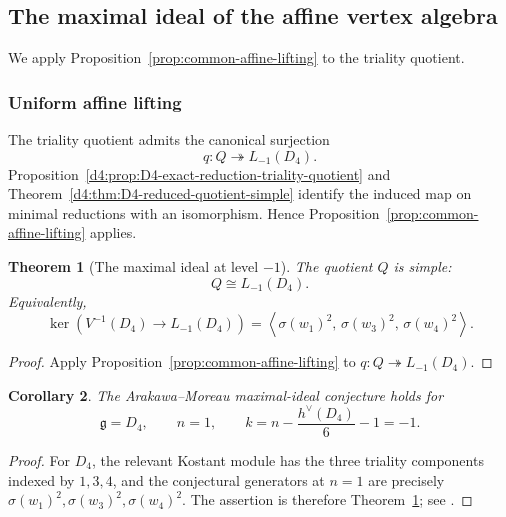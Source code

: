 \documentclass[11pt,reqno]{amsart}
\newtheorem{theorem}{Theorem}[section]
\newtheorem{corollary}[theorem]{Corollary}
\theoremstyle{definition}
\theoremstyle{remark}
\begin{document}
\subsection{The maximal ideal of the affine vertex algebra}


We apply Proposition~\ref{prop:common-affine-lifting} to the triality quotient.

\subsubsection{Uniform affine lifting}


The triality quotient admits the canonical surjection
\begin{equation*}
 q:Q\twoheadrightarrow L_{-1}(D_4).
\end{equation*}
Proposition~\ref{d4:prop:D4-exact-reduction-triality-quotient} and
Theorem~\ref{d4:thm:D4-reduced-quotient-simple} identify the induced map on
minimal reductions with an isomorphism.  Hence
Proposition~\ref{prop:common-affine-lifting} applies.

\begin{theorem}[The maximal ideal at level \(-1\)]
\label{d4:thm:D4-main-maximal-ideal}
The quotient \(Q\) is simple:
\begin{equation*}
  Q\cong L_{-1}(D_4).
\end{equation*}
Equivalently,
\begin{equation*}
  \ker\!\left(
    V^{-1}(D_4)\longrightarrow L_{-1}(D_4)
  \right)
  =
  \left\langle
    \sigma(w_1)^2,\,
    \sigma(w_3)^2,\,
    \sigma(w_4)^2
  \right\rangle.
\end{equation*}
\end{theorem}

\begin{proof}
Apply Proposition~\ref{prop:common-affine-lifting} to
$q:Q\twoheadrightarrow L_{-1}(D_4)$.
\end{proof}

\begin{corollary}

The Arakawa--Moreau maximal-ideal conjecture holds for
\[
  \mathfrak g=D_4,
  \qquad
  n=1,
  \qquad
  k=n-\frac{h^\vee(D_4)}6-1=-1.
\]
\end{corollary}

\begin{proof}
For \(D_4\), the relevant Kostant module has the three triality
components indexed by \(1,3,4\), and the conjectural generators at
\(n=1\) are precisely
\(\sigma(w_1)^2,\sigma(w_3)^2,\sigma(w_4)^2\).
The assertion is therefore Theorem~\ref{d4:thm:D4-main-maximal-ideal};
see \cite{ArakawaMoreau2018}.
\end{proof}
\end{document}

